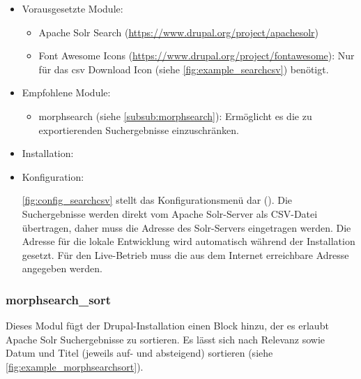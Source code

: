 \begin{itemize}[parsep=0pt, itemsep=5.0pt plus 2.0pt minus 1.0pt, leftmargin=*]
	\item Vorausgesetzte Module:
	
	\begin{itemize}
		\item 	Apache Solr Search (\url{https://www.drupal.org/project/apachesolr})
		
		\item Font Awesome Icons (\url{https://www.drupal.org/project/fontawesome}): Nur für das csv Download Icon (siehe \cref{fig:example_searchcsv}) benötigt.
	\end{itemize}
	
	
	\item Empfohlene Module:
	
	\begin{itemize}
		\item morphsearch (siehe \cref{subsub:morphsearch}): Ermöglicht es die zu exportierenden Suchergebnisse einzuschränken.
	\end{itemize}
	
	
	\item Installation: \standardinstall
	
	\item Konfiguration:
	
	\cref{fig:config_searchcsv} stellt das Konfigurationsmenü dar (). Die Suchergebnisse werden direkt vom Apache Solr-Server als CSV-Datei übertragen, daher muss die Adresse des Solr-Servers eingetragen werden. Die Adresse für die lokale Entwicklung wird automatisch während der Installation gesetzt. Für den Live-Betrieb muss die aus dem Internet erreichbare Adresse angegeben werden.

\end{itemize}






\newpage
\subsubsection{morphsearch\_sort}\label{subsub:morphsearchsort}
Dieses Modul fügt der Drupal-Installation einen Block hinzu, der es erlaubt Apache Solr Suchergebnisse zu sortieren. Es lässt sich nach Relevanz sowie Datum und Titel (jeweils auf- und absteigend) sortieren (siehe \cref{fig:example_morphsearchsort}).


